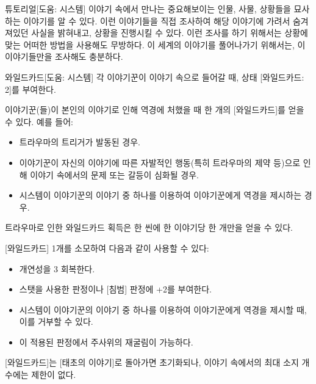 \documentclass{report}
\begin{document}
	\begin{story}{튜토리얼}{[도움: 시스템]}
		이야기 속에서 만나는 중요해보이는 인물, 사물, 상황들을 묘사하는 이야기를 알 수 있다. 이런 이야기들을 직접 조사하여 해당 이야기에 가려서 숨겨져있던 사실을 밝혀내고, 상황을 진행시킬 수 있다. 이런 조사를 하기 위해서는 상황에 맞는 어떠한 방법을 사용해도 무방하다. 이 세계의 이야기를 풀어나가기 위해서는, 이 이야기들만을 조사해도 충분하다.
	\end{story}
	
	\begin{story}{와일드카드}{[도움: 시스템]}
		각 이야기꾼이 이야기 속으로 들어갈 때, 상태 [와일드카드: 2]를 부여한다.
		
		\smallskip
		
		이야기꾼(들)이 본인의 이야기로 인해 역경에 처했을 때 한 개의 [와일드카드]를 얻을 수 있다. 예를 들어:
		\begin{itemize}
			\item 트라우마의 트리거가 발동된 경우.
			\item 이야기꾼이 자신의 이야기에 따른 자발적인 행동(특히 트라우마의 제약 등)으로 인해 이야기 속에서의 문제 또는 갈등이 심화될 경우.
			\item 시스템이 이야기꾼의 이야기 중 하나를 이용하여 이야기꾼에게 역경을 제시하는 경우.
		\end{itemize}
		트라우마로 인한 와일드카드 획득은 한 씬에 한 이야기당 한 개만을 얻을 수 있다.
		
		\smallskip
		
		[와일드카드] 1개를 소모하여 다음과 같이 사용할 수 있다:
		\begin{itemize}
			\item 개연성을 3 회복한다.
			\item 스탯을 사용한 판정이나 [침범] 판정에 +2를 부여한다.
			\item 시스템이 이야기꾼의 이야기 중 하나를 이용하여 이야기꾼에게 역경을 제시할 때, 이를 거부할 수 있다.
			\item {}이 적용된 판정에서 주사위의 재굴림이 가능하다.
		\end{itemize}
		
		\smallskip
		
		[와일드카드]는 [태초의 이야기]로 돌아가면 초기화되나, 이야기 속에서의 최대 소지 개수에는 제한이 없다.
	\end{story}
\end{document}

